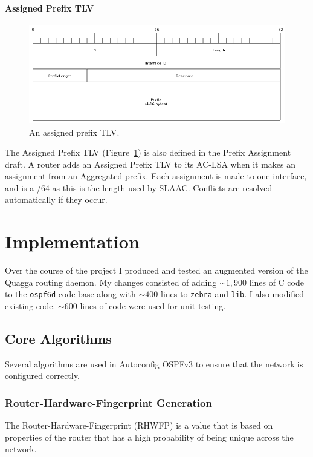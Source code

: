 \documentclass[12pt,a4paper,twoside]{report}
\newcommand*{\mysym}{\mathord{\sim}}
\begin{document}
\subsubsection{Assigned Prefix TLV}
\begin{figure}
\begin{center}
	\includegraphics[width=\linewidth]{../Diagrams/Packets/assigned_prefix_tlv.png}
	\caption{An assigned prefix TLV.}\label{fig:AssignedPrefix-TLV}
\end{center}
\end{figure}
The Assigned Prefix TLV (Figure~\ref{fig:AssignedPrefix-TLV}) is also defined
in the Prefix Assignment draft. A router adds an Assigned Prefix TLV to its
AC-LSA when it makes an assignment from an Aggregated prefix. Each assignment
is made to one interface, and is a /64 as this is the length used by SLAAC\@.
Conflicts are resolved automatically if they occur. 

\chapter{Implementation}
Over the course of the project I produced and tested an augmented version of
the Quagga routing daemon. My changes consisted of adding $\mysym1,900$ lines
of C code to the \texttt{ospf6d} code base along with $\mysym400$ lines to
\texttt{zebra} and \texttt{lib}. I also modified existing code. $\mysym600$
lines of code were used for unit testing.

\section{Core Algorithms}
Several algorithms are used in Autoconfig OSPFv3 to ensure that the network
is configured correctly.

\subsection{Router-Hardware-Fingerprint Generation}
The Router-Hardware-Fingerprint (RHWFP) is a value that is based on properties of
the router that has a high probability of being unique across the network. 
\end{document}
